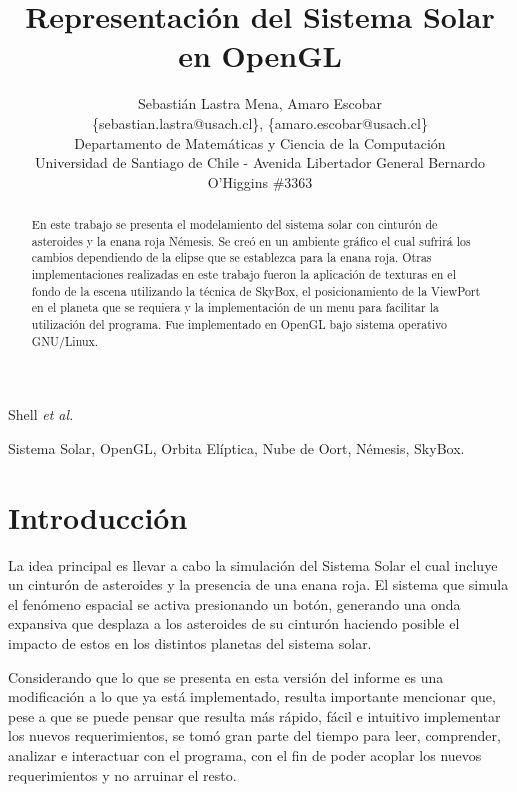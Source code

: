\documentclass[journal]{IEEEtran}
\begin{document}
\title{Representación del Sistema Solar en OpenGL}

\author{Sebastián Lastra Mena, Amaro Escobar\\ \{sebastian.lastra@usach.cl\}, \{amaro.escobar@usach.cl\}\\Departamento de Matemáticas y Ciencia de la Computación \\ Universidad de Santiago de Chile - Avenida Libertador General Bernardo O'Higgins \#3363 
}

{Shell \MakeLowercase{\textit{et al.}}}

\maketitle

\begin{abstract}
	En este trabajo se presenta el modelamiento del sistema solar con cinturón de asteroides y la enana roja 	Némesis. Se creó en un ambiente gráfico el cual sufrirá los cambios dependiendo de la elipse que se establezca para la enana roja. Otras implementaciones realizadas en este trabajo fueron la aplicación de texturas en el fondo de la escena utilizando la técnica de SkyBox, el posicionamiento de la ViewPort en el planeta que se requiera y la implementación de un menu para facilitar la utilización del programa. Fue implementado en OpenGL bajo sistema operativo GNU/Linux.
\end{abstract}

\begin{keywords}
	Sistema Solar, OpenGL, Orbita Elíptica, Nube de Oort, Némesis, SkyBox.
\end{keywords}

\IEEEpeerreviewmaketitle

\section{Introducción}

	La idea principal es llevar a cabo la simulación del Sistema Solar el cual incluye un cinturón de asteroides y la presencia de una enana roja. El sistema que simula el fenómeno espacial se activa presionando un botón, generando una onda expansiva que desplaza a los asteroides de su cinturón haciendo posible el impacto de estos en los distintos planetas del sistema solar.

	Considerando que lo que se presenta en esta versión del informe es una modificación a lo que ya está implementado, resulta importante mencionar que, pese a que se puede pensar que resulta más rápido, fácil e intuitivo implementar los nuevos requerimientos, se tomó gran parte del tiempo para leer, comprender, analizar e interactuar con el programa, con el fin de poder acoplar los nuevos requerimientos y no arruinar el resto.
\end{document}
